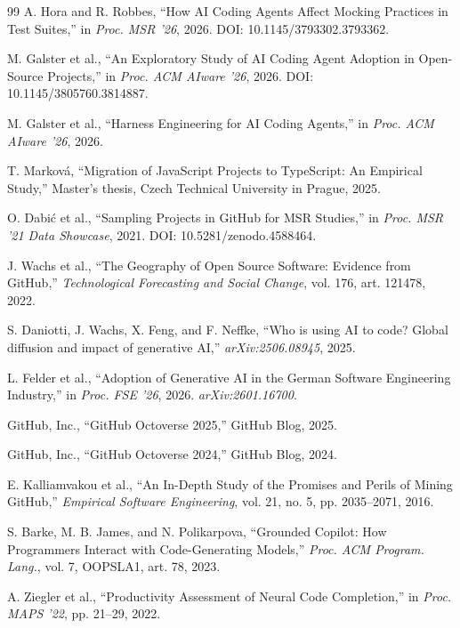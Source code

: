 \documentclass[11pt,a4paper]{article}
\begin{document}
\begin{thebibliography}{99}
A. Hora and R. Robbes,
``How AI Coding Agents Affect Mocking Practices in Test Suites,''
in \textit{Proc. MSR '26}, 2026. DOI: 10.1145/3793302.3793362.

M. Galster et al.,
``An Exploratory Study of AI Coding Agent Adoption in Open-Source Projects,''
in \textit{Proc. ACM AIware '26}, 2026. DOI: 10.1145/3805760.3814887.

M. Galster et al.,
``Harness Engineering for AI Coding Agents,''
in \textit{Proc. ACM AIware '26}, 2026.

T. Markov\'{a},
``Migration of JavaScript Projects to TypeScript: An Empirical Study,''
Master's thesis, Czech Technical University in Prague, 2025.

O. Dabi\'{c} et al.,
``Sampling Projects in GitHub for MSR Studies,''
in \textit{Proc. MSR '21 Data Showcase}, 2021. DOI: 10.5281/zenodo.4588464.

J. Wachs et al.,
``The Geography of Open Source Software: Evidence from GitHub,''
\textit{Technological Forecasting and Social Change}, vol. 176, art. 121478, 2022.

S. Daniotti, J. Wachs, X. Feng, and F. Neffke,
``Who is using AI to code? Global diffusion and impact of generative AI,''
\textit{arXiv:2506.08945}, 2025.

L. Felder et al.,
``Adoption of Generative AI in the German Software Engineering Industry,''
in \textit{Proc. FSE '26}, 2026. \textit{arXiv:2601.16700}.

GitHub, Inc.,
``GitHub Octoverse 2025,'' GitHub Blog, 2025.

GitHub, Inc.,
``GitHub Octoverse 2024,'' GitHub Blog, 2024.

E. Kalliamvakou et al.,
``An In-Depth Study of the Promises and Perils of Mining GitHub,''
\textit{Empirical Software Engineering}, vol. 21, no. 5, pp. 2035--2071, 2016.

S. Barke, M. B. James, and N. Polikarpova,
``Grounded Copilot: How Programmers Interact with Code-Generating Models,''
\textit{Proc. ACM Program. Lang.}, vol. 7, OOPSLA1, art. 78, 2023.

A. Ziegler et al.,
``Productivity Assessment of Neural Code Completion,''
in \textit{Proc. MAPS '22}, pp. 21--29, 2022.


\end{thebibliography}
\end{document}
